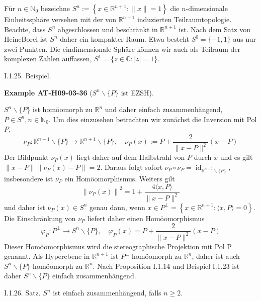 \documentclass[10pt, letterpaper]{article}
\newcommand{\CustomHeading}[3]{%
  \par\medskip\noindent%
  \textbf{#1 #2} \textnormal{(#3)}.\enskip%
}
\newenvironment{EXA}[2]{\begin{unitbox}\CustomHeading{Example}{#1}{#2}}{\end{unitbox}}
\begin{document}
Für $n \in \mathbb{N}_{0}$ bezeichne $S^{n}:=\left\{x \in \mathbb{R}^{n+1}:\|x\|=1\right\}$ die $n$-dimensionale Einheitssphäre versehen mit der von $\mathbb{R}^{n+1}$ induzierten Teilraumtopologie. Beachte, dass $S^{n}$ abgeschlossen und beschränkt in $\mathbb{R}^{n+1}$ ist. Nach dem Satz von HeineBorel ist $S^{n}$ daher ein kompakter Raum. Etwa besteht $S^{0}=\{-1,1\}$ aus nur zwei Punkten. Die eindimensionale Sphäre können wir auch als Teilraum der komplexen Zahlen auffassen, $S^{1}=\{z \in \mathbb{C}:|z|=1\}$.


I.1.25. Beispiel. 

\begin{EXA}{AT-H09-03-36}{$S^n\backslash \{P\}$ ist EZSH}
$S^{n} \backslash\{P\}$ ist homöomorph zu $\mathbb{R}^{n}$ und daher einfach zusammenhängend, $P \in S^{n}, n \in \mathbb{N}_{0}$. Um dies einzusehen betrachten wir zunächst die Inversion mit Pol $P$,
$$
\nu_{P}: \mathbb{R}^{n+1} \backslash\{P\} \rightarrow \mathbb{R}^{n+1} \backslash\{P\}, \quad \nu_{P}(x):=P+\frac{2}{\|x-P\|^{2}}(x-P)
$$
Der Bildpunkt $\nu_{P}(x)$ liegt daher auf dem Halbstrahl von $P$ durch $x$ und es gilt $\|x-P\|\left\|\nu_{P}(x)-P\right\|=2$. Daraus folgt sofort $\nu_{P} \circ \nu_{P}=\operatorname{id}_{\mathbb{R}^{n+1} \backslash\{P\}}$, insbesondere ist $\nu_{P}$ ein Homöomorphismus. Weiters gilt
$$
\left\|\nu_{P}(x)\right\|^{2}=1+\frac{4\langle x, P\rangle}{\|x-P\|^{2}}
$$
und daher ist $\nu_{P}(x) \in S^{n}$ genau dann, wenn $x \in P^{\perp}=\left\{x \in \mathbb{R}^{n+1}:\langle x, P\rangle=0\right\}$. Die Einschränkung von $\nu_{P}$ liefert daher einen Homöomorphismus
$$
\varphi_{P}: P^{\perp} \rightarrow S^{n} \backslash\{P\}, \quad \varphi_{P}(x)=P+\frac{2}{\|x-P\|^{2}}(x-P)
$$
Dieser Homöomorphismus wird die stereographische Projektion mit Pol P genannt. Als Hyperebene in $\mathbb{R}^{n+1}$ ist $P^{\perp}$ homöomorph zu $\mathbb{R}^{n}$, daher ist auch $S^{n} \backslash\{P\}$ homöomorph zu $\mathbb{R}^{n}$. Nach Proposition I.1.14 und Beispiel I.1.23 ist daher $S^{n} \backslash\{P\}$ einfach zusammenhängend.
\end{EXA}


I.1.26. Satz. $S^{n}$ ist einfach zusammenhängend, falls $n \geq 2$.
\end{document}
